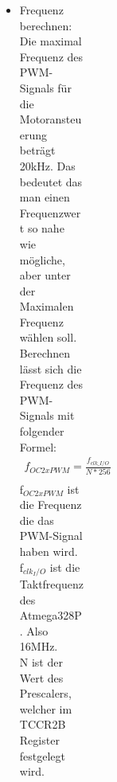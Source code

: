 \begin{figure}[H]
\begin{center}
\begin{figure}[H]
\begin{center}
\begin{figure}[H]
\begin{center}
\begin{figure}[H]
\begin{center}
\begin{figure}[H]
\begin{center}
\begin{itemize}
\begin{itemize}
\begin{itemize}
\end{itemize} 
\item TCCR2B: Im TCCR2B Register wird für unsere Anwendung der Prescaler festgelegt um die frequenz des PWM-Signales einzustellen. Dazu werden die Bits 0 bis 2 verwendet. Das sind die Bits CS20, CS21 und CS22. Die Bits FOC2A, FOC2B und WGM22 werden in unserer Anwendung nicht benötigt und können ignoriert werden. \\
\item OCR2A: Das Register OCR2A ist das Output Compare Match Register für den OC2A Pin. Das Register kann einen Wert zwischen 0 und 255 haben wobei, im Fast PWM Modus, 0 einem Duty Cycle von 0\% und 255 einem Duty Cycle von 100\% entspricht.\\
\item OCR2B: Das Register OCR2B ist das Output Compare Match Register für den OC2B Pin. Das Register kann einen Wert zwischen 0 und 255 haben wobei, im Fast PWM Modus, 0 einem Duty Cycle von 0\% und 255 einem Duty Cycle von 100\% entspricht.\\
\item DDRD: Im Register DDRD können I/O Pins als Output Pins gesetzt werden. Es muss nur das Bit des entsprechenden Pins gesetzt werden.\\
\item DDRB: Im Register DDRB können I/O Pins als Output Pins gesetzt werden. Es muss nur das Bit des entsprechenden Pins gesetzt werden.\\
\end{itemize}
\item Frequenz berechnen:\\
Die maximal Frequenz des PWM-Signals für die Motoransteuerung beträgt 20kHz. Das bedeutet das man einen Frequenzwert so nahe wie mögliche, aber unter der Maximalen Frequenz wählen soll.\\
Berechnen lässt sich die Frequenz des PWM-Signals mit folgender Formel:
\begin{align*}
f_{OC2xPWM}=\frac{f_{clk\_I/O}}{N*256} \\
\end{align*} 
f$_{OC2xPWM}$ ist die Frequenz die das PWM-Signal haben wird.\\
f$_{clk_I/O}$ ist die Taktfrequenz des Atmega328P. Also 16MHz. \\
N ist der Wert des Prescalers, welcher im TCCR2B Register festgelegt wird. \\


\end{itemize}
\end{center}
\end{figure}
\end{center}
\end{figure}
\end{center}
\end{figure}
\end{center}
\end{figure}
\end{center}
\end{figure}
